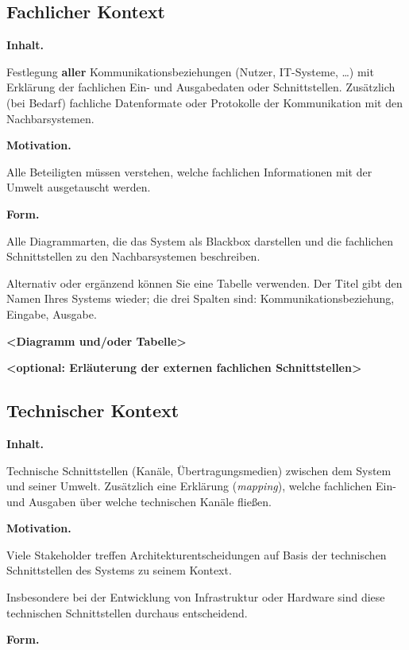 \documentclass[]{article}
\begin{document}
\hypertarget{_fachlicher_kontext}{%
\subsection{Fachlicher Kontext}\label{_fachlicher_kontext}}

\textbf{Inhalt.}

Festlegung \textbf{aller} Kommunikationsbeziehungen (Nutzer, IT-Systeme,
\ldots{}) mit Erklärung der fachlichen Ein- und Ausgabedaten oder
Schnittstellen. Zusätzlich (bei Bedarf) fachliche Datenformate oder
Protokolle der Kommunikation mit den Nachbarsystemen.

\textbf{Motivation.}

Alle Beteiligten müssen verstehen, welche fachlichen Informationen mit
der Umwelt ausgetauscht werden.

\textbf{Form.}

Alle Diagrammarten, die das System als Blackbox darstellen und die
fachlichen Schnittstellen zu den Nachbarsystemen beschreiben.

Alternativ oder ergänzend können Sie eine Tabelle verwenden. Der Titel
gibt den Namen Ihres Systems wieder; die drei Spalten sind:
Kommunikationsbeziehung, Eingabe, Ausgabe.

\textbf{\textless{}Diagramm und/oder Tabelle\textgreater{}}

\textbf{\textless{}optional: Erläuterung der externen fachlichen
Schnittstellen\textgreater{}}

\hypertarget{_technischer_kontext}{%
\subsection{Technischer Kontext}\label{_technischer_kontext}}

\textbf{Inhalt.}

Technische Schnittstellen (Kanäle, Übertragungsmedien) zwischen dem
System und seiner Umwelt. Zusätzlich eine Erklärung (\emph{mapping}),
welche fachlichen Ein- und Ausgaben über welche technischen Kanäle
fließen.

\textbf{Motivation.}

Viele Stakeholder treffen Architekturentscheidungen auf Basis der
technischen Schnittstellen des Systems zu seinem Kontext.

Insbesondere bei der Entwicklung von Infrastruktur oder Hardware sind
diese technischen Schnittstellen durchaus entscheidend.

\textbf{Form.}
\end{document}

